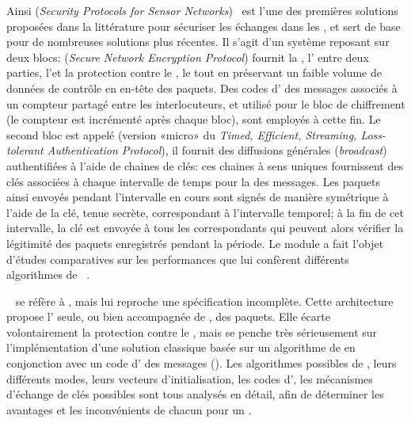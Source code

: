 Ainsi  (\textit{Security Protocols for Sensor Networks})~\cite{PSWCT02} est l'une des premières solutions proposées dans la littérature pour sécuriser les échanges dans les \rcs, et sert de base pour de nombreuses solutions plus récentes.
Il s'agit d'un système reposant sur deux blocs:  (\textit{Secure Network Encryption Protocol}) fournit la , l' entre deux parties, l'\integrite et la protection contre le , le tout en préservant un faible volume de données de contrôle en en-tête des paquets.
Des codes d' des messages associés à un compteur partagé entre les interlocuteurs, et utilisé pour le bloc de chiffrement (le compteur est incrémenté après chaque bloc), sont employés à cette fin.
Le second bloc est appelé  (version «micro» du \textit{Timed, Efficient, Streaming, Loss-tolerant Authentication Protocol}), il fournit des diffusions générales (\textit{broadcast}) authentifiées à l'aide de chaines de clés: ces chaines à sens uniques fournissent des clés associées à chaque intervalle de temps pour la  des messages.
Les paquets ainsi envoyés pendant l'intervalle en cours sont signés de manière symétrique à l'aide de la clé, tenue secrète, correspondant à l'intervalle temporel; à la fin de cet intervalle, la clé est envoyée à tous les correspondants qui peuvent alors vérifier la légitimité des paquets enregistrés pendant la période.
Le module  a fait l'objet d'études comparatives sur les performances que lui confèrent différents algorithmes de ~\cite{SS14-snep}.

~\cite{KSW04} se réfère à , mais lui reproche une spécification incomplète.
Cette architecture propose l' seule, ou bien accompagnée de , des paquets.
Elle écarte volontairement la protection contre le , mais se penche très sérieusement sur l'implémentation d'une solution classique basée sur un algorithme de  en conjonction avec un code d' des messages (\macc).
Les algorithmes possibles de , leurs différents modes, leurs vecteurs d'initialisation, les codes d', les mécanismes d'échange de clés possibles sont tous analysés en détail, afin de déterminer les avantages et les inconvénients de chacun pour un \rc.

